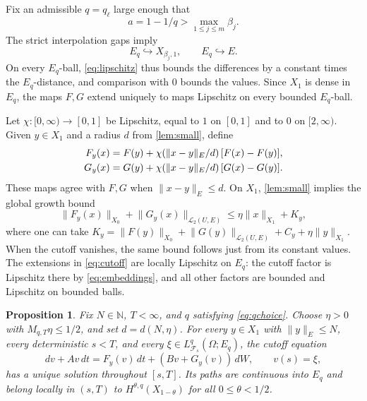 \documentclass[11pt]{amsart}
\newtheorem{proposition}[theorem]{Proposition}
\theoremstyle{definition}
\theoremstyle{remark}
\newcommand{\N}{\mathbb N}
\newcommand{\HS}{\mathcal L_2(U,E)}
\newcommand{\norm}[2][]{\lVert #2\rVert_{#1}}
\numberwithin{equation}{section}
\begin{document}
Fix an admissible $q=q_\ell$ large enough that
\begin{equation}\label{eq:qchoice}
 a=1-1/q>\max_{1\le j\le m}\beta_j.
\end{equation}
The strict interpolation gaps imply
\begin{equation}\label{eq:embeddings}
 E_q\hookrightarrow X_{\beta_j,1},\qquad E_q\hookrightarrow E.
\end{equation}
On every $E_q$-ball, \eqref{eq:lipschitz} thus bounds the differences
by a constant times the $E_q$-distance, and comparison with $0$ bounds
the values. Since $X_1$ is dense in $E_q$, the maps $F,G$ extend
uniquely to maps Lipschitz on every bounded $E_q$-ball.

Let $\chi:[0,\infty)\to[0,1]$ be Lipschitz, equal to $1$ on $[0,1]$
and to $0$ on $[2,\infty)$. Given $y\in X_1$ and a radius $d$ from
\cref{lem:small}, define
\begin{align}\label{eq:cutoff}
 F_y(x)&=F(y)+\chi(\norm[E]{x-y}/d)\,[F(x)-F(y)],\notag\\
 G_y(x)&=G(y)+\chi(\norm[E]{x-y}/d)\,[G(x)-G(y)].
\end{align}
These maps agree with $F,G$ when $\norm[E]{x-y}\le d$. On $X_1$,
\cref{lem:small} implies the global growth bound
\begin{equation}\label{eq:cutgrowth}
 \norm[X_0]{F_y(x)}+\norm[\HS]{G_y(x)}
 \le\eta\norm[X_1]{x}+K_y,
\end{equation}
where one can take
$K_y=\norm[X_0]{F(y)}+\norm[\HS]{G(y)}+C_y+\eta\norm[X_1]{y}$.
When the cutoff vanishes, the same bound follows just from its constant
values. The extensions in \eqref{eq:cutoff} are locally Lipschitz on
$E_q$: the cutoff factor is Lipschitz there by \eqref{eq:embeddings},
and all other factors are bounded and Lipschitz on bounded balls.

\begin{proposition}\label{prop:cutoff}
Fix $N\in\N$, $T<\infty$, and $q$ satisfying \eqref{eq:qchoice}.
Choose $\eta>0$ with $M_{q,T}\eta\le1/2$, and set $d=d(N,\eta)$.
For every $y\in X_1$ with $\norm[E]{y}\le N$, every deterministic
$s<T$, and every $\xi\in L^q_{\mathcal F_s}(\Omega;E_q)$, the cutoff
equation
\begin{equation}\label{eq:cutoffeq}
 dv+Av\,dt=F_y(v)\,dt+(Bv+G_y(v))\,dW,\qquad v(s)=\xi,
\end{equation}
has a unique solution throughout $[s,T]$. Its paths are continuous into
$E_q$ and belong locally in $(s,T)$ to
$H^{\theta,q}(X_{1-\theta})$ for all $0\le\theta<1/2$.
\end{proposition}
\end{document}
